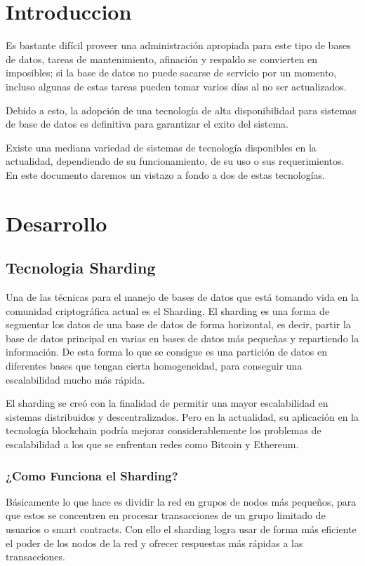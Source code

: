 \documentclass[twoside,twocolumn]{article}
\begin{document}
\section{Introduccion}



Es bastante difícil proveer una administración apropiada para este
 tipo de bases de datos, tareas de mantenimiento, afinación y respaldo
  se convierten en imposibles; si la base de datos no puede sacarse de
   servicio por un momento, incluso algunas de estas tareas pueden tomar
    varios días al no ser actualizados. 

Debido a esto, la adopción de una tecnología de alta disponibilidad para
 sistemas de base de datos es definitiva para garantizar el exito del sistema.  

Existe una mediana variedad de sistemas de tecnología disponibles en la 
actualidad, dependiendo de su funcionamiento, de su uso o sus requerimientos.
 En este documento daremos un vistazo a fondo a dos de estas tecnologías.  

\section{Desarrollo}

\subsection{Tecnologia Sharding }

Una de las técnicas para el manejo de bases de datos que está 
tomando vida en la comunidad criptográfica actual es el Sharding.
El sharding es una forma de segmentar los 
datos de una base de datos de forma horizontal, es decir, 
partir la base de datos principal en varias en bases de datos 
más pequeñas y repartiendo la información. De esta forma lo que 
se consigue es una partición de datos en diferentes bases que tengan 
cierta homogeneidad, para conseguir una escalabilidad mucho más rápida. 


El sharding se creó con la finalidad de permitir una mayor
 escalabilidad en sistemas distribuidos y descentralizados. 
 Pero en la actualidad, su aplicación en la tecnología blockchain 
 podría mejorar considerablemente los problemas de escalabilidad a 
 los que se enfrentan redes como Bitcoin y Ethereum.

\subsubsection{¿Como Funciona el Sharding?}
Básicamente lo que hace es dividir la red
 en grupos de nodos más pequeños, para que 
 estos se concentren en procesar transacciones 
 de un grupo limitado de usuarios o smart contracts.
  Con ello el sharding logra usar de forma más eficiente
   el poder de los nodos de la red y ofrecer respuestas más
    rápidas a las transacciones.
\end{document}
